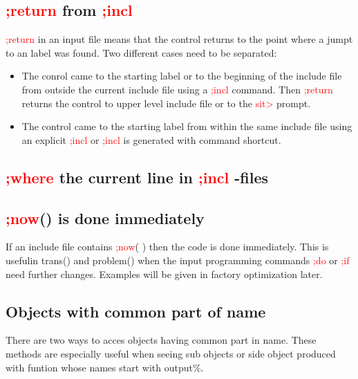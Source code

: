 \subsection{\textcolor{Red}{;return} from \textcolor{Red}{;incl}} 
\label{inpureturn} 
\textcolor{Red}{;return} in an input file means that the control returns to the point where a 
jumpt to an label was found. Two different cases need to be separated: 
\begin{itemize} 
\item The conrol came to the starting label or to the beginning of the include file 
from outside the current include file using a \textcolor{Red}{;incl} command. Then \textcolor{Red}{;return} returns the control to upper level include 
file or to the \textcolor{Red}{sit>} prompt. 
\item The control came to the starting label from within the same include file using 
an explicit \textcolor{Red}{;incl} or \textcolor{Red}{;incl} is generated 
with command shortcut. 
\end{itemize} 
\subsection{\textcolor{Red}{;where} the current line in \textcolor{Red}{;incl} -files} 
\label{inpuwhere} 
\subsection{\textcolor{Red}{;now}() is done immediately} 
\label{inpunow} 
If an include file contains \textcolor{Red}{;now}(   ) then the code is 
done immediately. This is usefulin \textcolor{VioletRed}{trans}() and \textcolor{VioletRed}{problem}() when 
the input programming commands \textcolor{Red}{;do} or \textcolor{Red}{;if} need further changes. 
Examples will be given in factory optimization later. 
\subsection{Objects with common part of name} 
\label{inpusubobj} 
There are two ways to acces objects having common part in name. These methods are especially useful 
when seeing sub objects or side object produced with funtion whose names start with output\%. 

